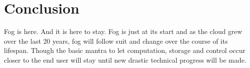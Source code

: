\section{Conclusion}

Fog is here. And it is here to stay. Fog is just at its start and as the cloud grew over the last 20 years, fog will follow suit and change over the course of its lifespan. Though the basic mantra to let computation, storage and control occur closer to the end user will stay until new drastic technical progress will be made.


